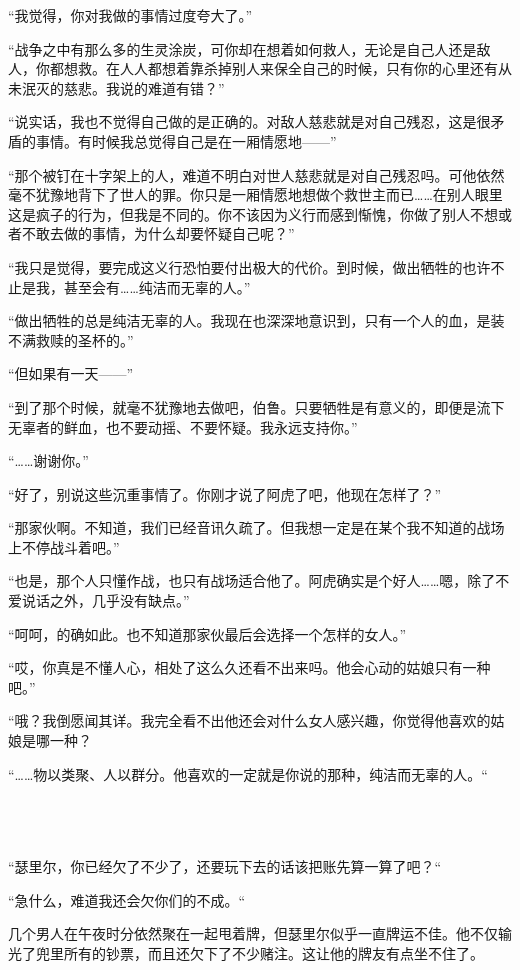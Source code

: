 “我觉得，你对我做的事情过度夸大了。”

“战争之中有那么多的生灵涂炭，可你却在想着如何救人，无论是自己人还是敌人，你都想救。在人人都想着靠杀掉别人来保全自己的时候，只有你的心里还有从未泯灭的慈悲。我说的难道有错？”

“说实话，我也不觉得自己做的是正确的。对敌人慈悲就是对自己残忍，这是很矛盾的事情。有时候我总觉得自己是在一厢情愿地——”

“那个被钉在十字架上的人，难道不明白对世人慈悲就是对自己残忍吗。可他依然毫不犹豫地背下了世人的罪。你只是一厢情愿地想做个救世主而已……在别人眼里这是疯子的行为，但我是不同的。你不该因为义行而感到惭愧，你做了别人不想或者不敢去做的事情，为什么却要怀疑自己呢？”

“我只是觉得，要完成这义行恐怕要付出极大的代价。到时候，做出牺牲的也许不止是我，甚至会有……纯洁而无辜的人。”

“做出牺牲的总是纯洁无辜的人。我现在也深深地意识到，只有一个人的血，是装不满救赎的圣杯的。”

“但如果有一天——”

“到了那个时候，就毫不犹豫地去做吧，伯鲁。只要牺牲是有意义的，即便是流下无辜者的鲜血，也不要动摇、不要怀疑。我永远支持你。”

“……谢谢你。”

“好了，别说这些沉重事情了。你刚才说了阿虎了吧，他现在怎样了？”

“那家伙啊。不知道，我们已经音讯久疏了。但我想一定是在某个我不知道的战场上不停战斗着吧。”

“也是，那个人只懂作战，也只有战场适合他了。阿虎确实是个好人……嗯，除了不爱说话之外，几乎没有缺点。”

“呵呵，的确如此。也不知道那家伙最后会选择一个怎样的女人。”

“哎，你真是不懂人心，相处了这么久还看不出来吗。他会心动的姑娘只有一种吧。”

“哦？我倒愿闻其详。我完全看不出他还会对什么女人感兴趣，你觉得他喜欢的姑娘是哪一种？

“……物以类聚、人以群分。他喜欢的一定就是你说的那种，纯洁而无辜的人。“

 \section*{}

“瑟里尔，你已经欠了不少了，还要玩下去的话该把账先算一算了吧？“

“急什么，难道我还会欠你们的不成。“

几个男人在午夜时分依然聚在一起甩着牌，但瑟里尔似乎一直牌运不佳。他不仅输光了兜里所有的钞票，而且还欠下了不少赌注。这让他的牌友有点坐不住了。

